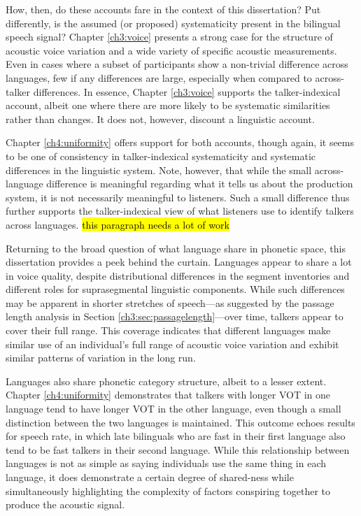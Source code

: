 How, then, do these accounts fare in the context of this dissertation? Put differently, is the assumed (or proposed) systematicity present in the bilingual speech signal? Chapter \ref{ch3:voice} presents a strong case for the structure of acoustic voice variation and a wide variety of specific acoustic measurements. Even in cases where a subset of participants show a non-trivial difference across languages, few if any differences are large, especially when compared to across-talker differences. In essence, Chapter \ref{ch3:voice} supports the talker-indexical account, albeit one where there are more likely to be systematic similarities rather than changes. It does not, however, discount a linguistic account. 

Chapter \ref{ch4:uniformity} offers support for both accounts, though again, it seems to be one of consistency in talker-indexical systematicity and systematic differences in the linguistic system. Note, however, that while the small across-language difference is meaningful regarding what it tells us about the production system, it is not necessarily meaningful to listeners. Such a small difference thus further supports the talker-indexical view of what listeners use to identify talkers across languages. \hl{this paragraph needs a lot of work}

Returning to the broad question of what language share in phonetic space, this dissertation provides a peek behind the curtain. Languages appear to share a lot in voice quality, despite distributional differences in the segment inventories and different roles for suprasegmental linguistic components. While such differences may be apparent in shorter stretches of speech---as suggested by the passage length analysis in Section \ref{ch3:sec:passagelength}---over time, talkers appear to cover their full range. This coverage indicates that different languages make similar use of an individual's full range of acoustic voice variation and exhibit similar patterns of variation in the long run. 

Languages also share phonetic category structure, albeit to a lesser extent. Chapter \ref{ch4:uniformity} demonstrates that talkers with longer VOT in one language tend to have longer VOT in the other language, even though a small distinction between the two languages is maintained. This outcome echoes results for speech rate, in which late bilinguals who are fast in their first language also tend to be fast talkers in their second language. While this relationship between languages is not as simple as saying individuals use the same thing in each language, it does demonstrate a certain degree of shared-ness while simultaneously highlighting the complexity of factors conspiring together to produce the acoustic signal. 

